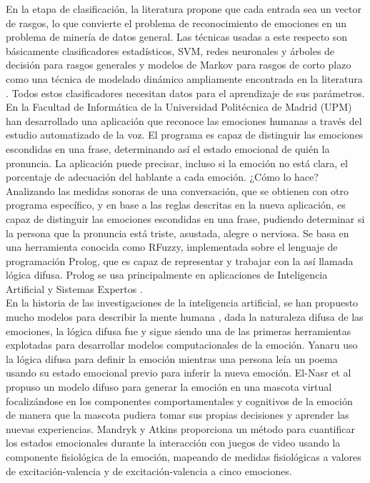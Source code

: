\documentclass[11pt,lettersize]{article} %
\begin{document}
En la etapa de clasificación, la literatura propone que cada entrada sea un vector de rasgos, lo que convierte el problema de reconocimiento de emociones en un problema de minería de datos general. Las técnicas usadas a este respecto son básicamente clasificadores estadísticos, SVM, redes neuronales y árboles de decisión para rasgos generales y modelos de Markov para rasgos de corto plazo como una técnica de modelado dinámico ampliamente encontrada en la literatura \cite{Wagner2007}. Todos estos clasificadores necesitan datos para el aprendizaje de sus parámetros. \\

En la Facultad de Informática de la Universidad Politécnica de Madrid (UPM) han desarrollado una aplicación que reconoce las emociones humanas a través del estudio automatizado de la voz. El programa es capaz de distinguir las emociones escondidas en una frase, determinando así el estado emocional de quién la pronuncia. La aplicación puede precisar, incluso si la emoción no está clara, el porcentaje de adecuación del hablante a cada emoción. ¿Cómo lo hace? Analizando las medidas sonoras de una conversación, que se obtienen con otro programa específico, y en base a las reglas descritas en la nueva aplicación, es capaz de distinguir las emociones escondidas en una frase, pudiendo determinar si la persona que la pronuncia está triste, asustada, alegre o nerviosa. Se basa en una herramienta conocida como RFuzzy, implementada sobre el lenguaje de programación Prolog, que es capaz de representar y trabajar con la así llamada lógica difusa. Prolog se usa principalmente en aplicaciones de Inteligencia Artificial y Sistemas Expertos \cite{Munoz-Hernandez2009}.\\

En la historia de las investigaciones de la inteligencia artificial, se han propuesto mucho modelos para describir la mente humana \cite{El-Nasr2000}, dada la naturaleza difusa de las emociones, la lógica difusa fue y sigue siendo una de las primeras herramientas explotadas para desarrollar modelos computacionales de la emoción. Yanaru \cite{Yanaru1997} uso la lógica difusa para definir la emoción mientras una persona leía un poema usando su estado emocional previo para inferir la nueva emoción. El-Nasr et al \cite{El-Nasr2000} propuso un modelo difuso para generar la emoción en una mascota virtual focalizándose en los componentes comportamentales y cognitivos de la emoción de manera que la mascota pudiera tomar sus propias decisiones y aprender las nuevas experiencias. Mandryk y Atkins \cite{Mandryk2007} proporciona un método para cuantificar los estados emocionales durante la interacción con juegos de video usando la componente fisiológica de la emoción, mapeando de medidas fisiológicas a valores de excitación-valencia y de excitación-valencia a cinco emociones.\\
\end{document}
